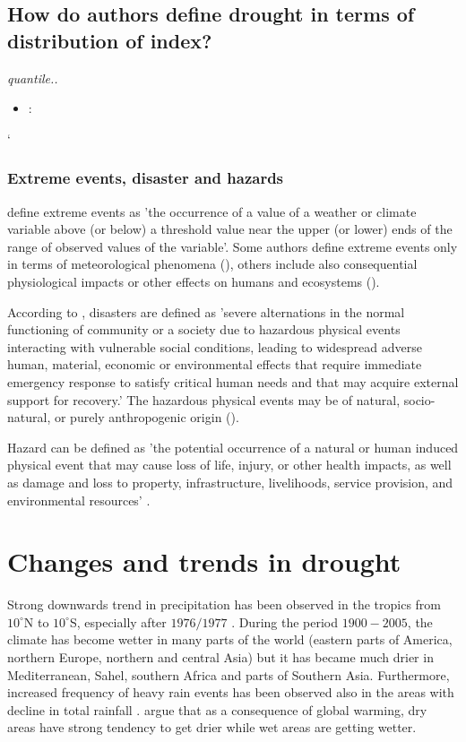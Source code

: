 \documentclass[a4paper,12pt]{article}
\begin{document}
\subsection*{How do authors define drought in terms of distribution of index?}
\textit{quantile..}
\begin{itemize}

\item \cite{Trenberth2014}:
\end{itemize}`

\subsubsection*{Extreme events, disaster and hazards}
\cite{IPCC2012ch1} define extreme events as 'the occurrence of a value of a weather or climate variable above (or below) a threshold value near the upper (or lower) ends of the range of observed values of the variable'. Some authors define extreme events only in terms of meteorological phenomena (\citealp{easterling2000, Jentsch2007}), others include also consequential physiological impacts or other effects on humans and ecosystems (\citealp{IPCC2012ch1, young2002}).


According to \cite{IPCC2012ch1}, disasters are defined as 'severe alternations in the normal functioning of community or a society due to hazardous physical events interacting with vulnerable social conditions, leading to widespread adverse human, material, economic or environmental effects that require immediate emergency response to satisfy critical human needs and that may acquire external support for recovery.' The hazardous physical events may be of natural, socio-natural, or purely anthropogenic origin (\citealp{IPCC2012ch1, wisner2004risk}).

Hazard can be defined as 'the potential occurrence of a natural or human induced
physical event that may cause loss of life, injury, or other
health impacts, as well as damage and loss to property, infrastructure,
livelihoods, service provision, and environmental resources' \citet{IPCC2012ch1}.
\section*{Changes and trends in drought}

 Strong downwards trend in precipitation has been observed in the tropics from $10^\circ$N to $10^\circ$S, especially after $1976/1977$ \citep{IPCCtrenberth}. During the period $1900-2005$, the climate has become wetter in many parts of the world (eastern parts of America, northern Europe, northern and central Asia) but it has became much drier in Mediterranean, Sahel, southern Africa and parts of Southern Asia. Furthermore, increased frequency of heavy rain events has been observed also in the areas with decline in total rainfall \citep{IPCCtrenberth}. \cite{Trenberth2014} argue that as a consequence of global warming, dry areas have strong tendency to get drier while wet areas are getting wetter. 
 
\end{document}

